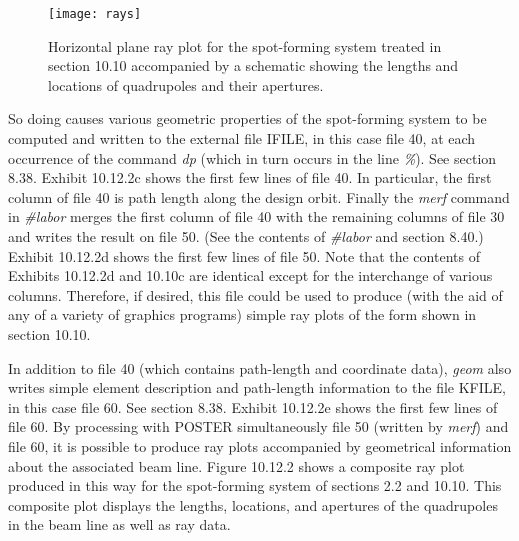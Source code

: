 \newpage
\renewcommand{\thefigure}{\thesubsection.\arabic{figure}}
\setcounter{figure}{0}
\begin{figure}[htp]
  \centering
  \texttt{[image: rays]}
  \caption{Horizontal plane ray plot for the spot-forming system treated
in section 10.10 accompanied by a schematic showing the lengths and
locations of quadrupoles and their apertures.}
\end{figure}

\newpage
\noindent So doing causes various geometric properties of the spot-forming system to
be computed and written to the external file IFILE, in this case file 40, at
each occurrence of the command {\em dp} (which in turn occurs in the line
{\em \%}).  See section 8.38.  Exhibit 10.12.2c shows the first few lines of file 40.  In
particular, the first column of file 40 is path length along the design orbit.
Finally the {\em merf} command in {\em \#labor} merges the first column of file 40 with the
remaining columns of file 30 and writes the result on file 50.  (See the
contents of {\em \#labor} and section 8.40.)  Exhibit 10.12.2d shows the first few lines of
file 50.  Note that the contents of Exhibits 10.12.2d and 10.10c are identical
except for the interchange of various columns.  Therefore, if desired, this file
could be used to produce (with the aid of any of a variety of graphics programs)
simple ray plots of the form shown in section 10.10.

In addition to file 40 (which contains path-length and coordinate data),
{\em geom} also writes simple element description and path-length information to
the file KFILE, in this case file 60.  See section 8.38.  Exhibit 10.12.2e
shows the first few lines of file 60.  By processing with POSTER simultaneously file
50 (written by {\em merf}) and file 60, it is possible to produce ray plots
accompanied by geometrical information about the associated beam line.
Figure 10.12.2
shows a composite ray plot produced in this way for the spot-forming system of
sections 2.2 and 10.10.  This composite plot displays the lengths,
locations, and apertures of the quadrupoles in the beam line as well as ray data.

